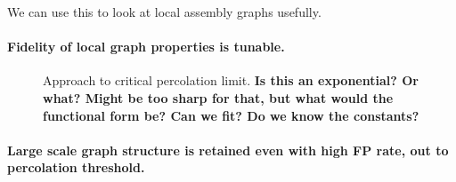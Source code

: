 \documentclass[12pt]{article} \usepackage{simplemargins}
\begin{document}
We can use this to look at local assembly graphs usefully.

\paragraph{Fidelity of local graph properties is tunable.}

\begin{figure}
\caption{Approach to critical percolation limit. {\bf Is this an
    exponential?  Or what?  Might be too sharp for that, but what
    would the functional form be? Can we fit?  Do we know the constants?}}
\end{figure}

\paragraph{Large scale graph structure is retained even with high FP rate, out to percolation threshold.}
\end{document}
